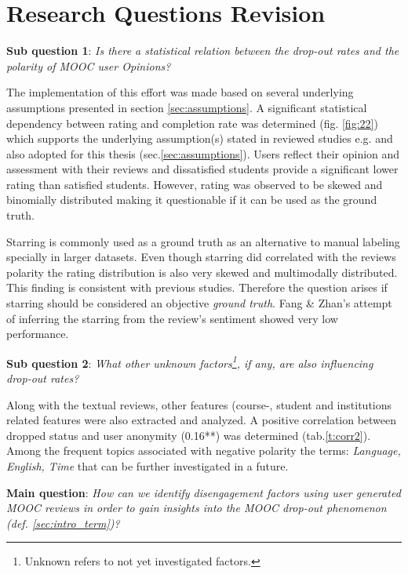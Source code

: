 \documentclass[
	a4paper,
	pdftex,
	12pt,	
	footinclude=true,
	fleqn,
	final,
	]{report}%
\begin{document}
\vspace{-0.45cm}
\section{Research Questions Revision} %
\vspace{-0.3cm}
\textbf{Sub question 1}: \textit{Is there a statistical relation between the 
drop-out rates and the polarity of MOOC user Opinions?}

The implementation of this effort was made based on several underlying 
assumptions presented in section \ref{sec:assumptions}.
A significant statistical dependency between rating and 
completion rate was determined (fig. \ref{fig:22}) which 
supports the underlying assumption(s)
stated in reviewed studies e.g. \cite{Adamopoulos2013,Coursetalk2015} and also
adopted for this thesis (sec.\ref{sec:assumptions}). 
Users reflect their opinion and assessment with their reviews
and dissatisfied students provide a significant lower rating than 
satisfied students. However, rating was observed to be skewed and 
binomially distributed making it questionable if it can be used 
as the ground truth.

Starring is commonly used as a ground truth as an alternative to 
manual labeling specially in larger datasets. Even though starring did
correlated with the reviews polarity the rating distribution 
is also very skewed and multimodally distributed. This finding is 
consistent with previous studies. Therefore the question arises if
starring should be considered an objective \emph{ground truth}. 
Fang \& Zhan's attempt of inferring the starring from the 
review's sentiment showed very low performance. 

\textbf{Sub question 2}: \textit{What other unknown factors\footnote{Unknown refers to not yet 
investigated factors.}, if any, are also influencing drop-out rates?}

Along with the textual reviews, other features (course-, student and institutions related
features were also extracted and analyzed. A positive correlation between dropped 
status and user anonymity (0.16**) was determined (tab.\ref{t:corr2}).
Among the frequent topics associated with negative polarity the terms:
\emph{Language, English, Time} that can be further investigated in a future.

\textbf{Main question}: \textit{How can we identify disengagement factors using 
user generated MOOC reviews in order to gain insights into the MOOC drop-out phenomenon
(def. \ref{sec:intro_term})?}
\end{document}
